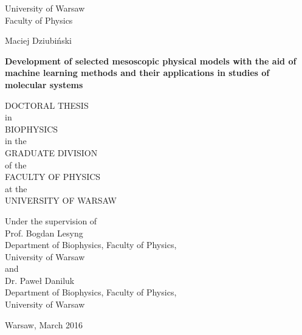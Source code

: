 \vspace{0cm}		%
\pagestyle{empty}	%

\begin{center}
\begin{huge}
	\textsf{University of Warsaw}\\
	\vspace{0.4cm}		%
	\textsf{Faculty of Physics}
\end{huge}

\vspace{1.25cm}		%

\begin{Large}
	Maciej Dziubi\'nski\\
\end{Large}

\vspace{1.25cm}

\begin{huge}
	\textbf{\textsf{Development of selected mesoscopic physical models with the aid of machine learning methods and their applications in studies of molecular systems}}
\end{huge}

\vspace{1.25cm}

\begin{large}
	DOCTORAL THESIS\\
	in\\
	BIOPHYSICS\\
	in the\\
	GRADUATE DIVISION\\
	of the\\
	FACULTY OF PHYSICS\\
	at the\\
	UNIVERSITY OF WARSAW
\end{large}

\end{center}

\vspace{1.5cm}		%

\begin{flushright}
\begin{large}
	Under the supervision of\\
	Prof. Bogdan Lesyng\\
	Department of Biophysics, Faculty of Physics,\\
	University of Warsaw\\ 
	and\\ 
	Dr. Pawe\l{} Daniluk\\
	Department of Biophysics, Faculty of Physics,\\
	University of Warsaw\\
\end{large}
\end{flushright}

\vspace{1.25cm}

\begin{center}
	Warsaw, March 2016
\end{center}


